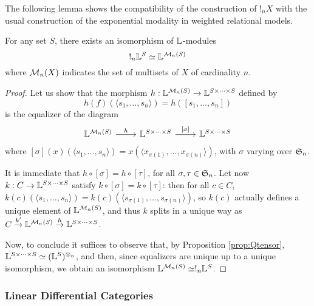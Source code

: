 The following lemma shows the compatibility of the construction of $!_{n}X$ with the usual construction of the exponential modality in weighted relational models.
\begin{lemma}
For any set $S$, there exists an isomorphism of $\mathbb{L}$-modules
$$!_{n}\mathbb{L}^{S} \simeq \mathbb{L}^{\mathcal{M}_{n}(S)}$$
where $\mathcal{M}_{n}(X)$ indicates the set of multisets of $X$ of cardinality $ n$.
\end{lemma}
\begin{proof}
Let us show that the morphism $h:\mathbb{L}^{\mathcal{M}_{n}(S)}\to \mathbb{L}^{S\times \dots \times S}$ defined by 
$$
h(f)(\langle s_{1},\dots, s_{n}\rangle)=h([s_{1},\dots, s_{n}])
$$
is the equalizer of the diagram 
$$
\begin{tikzcd}
\Lawv^{\C M_{n}(S)} \ar{r}{h} &\Lawv^{S\times \dots \times S}\ar{r}{[\sigma]} &
\Lawv^{S\times \dots \times S}
\end{tikzcd}
$$
where $[\sigma](x)(\langle s_{1},\dots, s_{n}\rangle)=x(\langle x_{\sigma(1)},\dots, x_{\sigma(n)}\rangle)$, with $\sigma$ varying over $\mathfrak{S}_{n}$.

It is immediate that $h\circ [\sigma]=h\circ [\tau]$, for all $\sigma,\tau\in \mathfrak{S}_{n}$. Let now $k: C\to \mathbb{L}^{S\times \dots \times S}$ satisfy $k\circ [\sigma]=k\circ [\tau]$: then for all $c\in C$, $k(c)(\langle s_{1},\dots, s_{n}\rangle)=k(c)(\langle s_{\sigma(1)},\dots, s_{\sigma(n)}\rangle)$, so $k(c)$ actually defines a unique element of $\mathbb{L}^{\mathcal{M}_{n}(S)}$, and thus $k$ splits in a unique way as $C \stackrel{k'}{\to} \mathbb{L}^{\mathcal{M}_{n}(S)} \stackrel{h}{\to}\mathbb{L}^{S\times \dots \times S}$.


Now, to conclude it suffices to observe that, by Proposition \ref{prop:Qtensor}, 
$\mathbb{L}^{S\times \dots \times S}\simeq (\mathbb{L}^{S})^{\otimes_{n}}$, and then, since equalizers are unique up to a unique isomorphism, we obtain an isomorphism $\mathbb{L}^{\mathcal{M}_{n}(S)}\simeq !_{n}\mathbb{L}^{S}$.
%
%
\end{proof}




\subsubsection{Linear Differential Categories}


